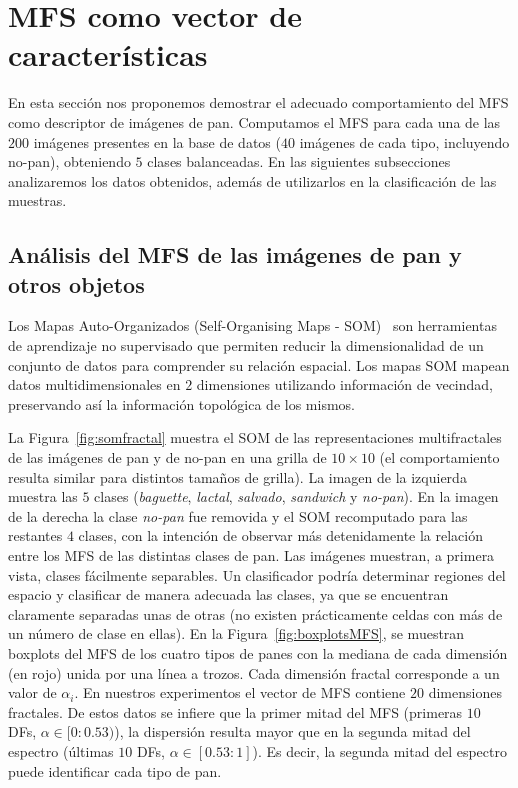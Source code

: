 \section{MFS como vector de características}

En esta sección nos proponemos demostrar el adecuado comportamiento del MFS como descriptor de imágenes de pan.
Computamos el MFS para cada una de las $200$ imágenes presentes en la base de datos ($40$ imágenes de cada tipo, incluyendo no-pan), obteniendo $5$ clases balanceadas.
En las siguientes subsecciones analizaremos los datos obtenidos, además de utilizarlos en la clasificación de las muestras.

\subsection{Análisis del MFS de las imágenes de pan y otros objetos}

Los Mapas Auto-Organizados (Self-Organising Maps -  \acrshort{SOM})~\cite{Kohonen2001} son herramientas de aprendizaje no supervisado que permiten reducir la dimensionalidad de un conjunto de datos para comprender su relación espacial.
Los mapas SOM mapean datos multidimensionales en $2$ dimensiones utilizando información de vecindad, preservando así la información topológica de los mismos.

La Figura~\ref{fig:somfractal} muestra el  SOM de las representaciones multifractales de las imágenes de pan y de no-pan en una grilla de $10\times 10$ (el comportamiento resulta similar para distintos tamaños de grilla).
La imagen de la izquierda muestra las $5$ clases ({\em baguette}, {\em lactal}, {\em salvado}, {\em sandwich} y {\em no-pan}).
En la imagen de la derecha la clase {\em no-pan} fue removida y el SOM recomputado para las restantes $4$ clases, con la intención de observar más detenidamente la relación entre los MFS de las distintas clases de pan.
Las imágenes muestran, a primera vista, clases fácilmente separables.
Un clasificador podría determinar regiones del espacio y clasificar de manera adecuada las clases, ya que se encuentran claramente separadas unas de otras (no existen prácticamente celdas con más de un número de clase en ellas).
En la Figura~\ref{fig:boxplotsMFS}, se muestran boxplots del MFS de los cuatro tipos de panes con la mediana de cada dimensión (en rojo) unida por una línea a trozos.
Cada dimensión fractal corresponde a un valor de $\alpha_{i}$.
En nuestros experimentos el vector de MFS contiene $20$ dimensiones fractales. De estos datos se infiere que la primer mitad del MFS (primeras $10$ DFs, $\alpha \in [0: 0.53)$), la dispersión resulta mayor que en la segunda mitad del espectro  (últimas $10$ DFs, $\alpha \in [0.53: 1]$).
Es decir, la segunda mitad del espectro puede identificar cada tipo de pan.


